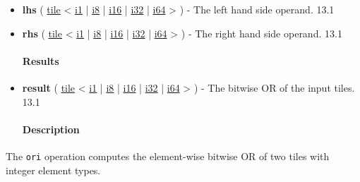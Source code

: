 \documentclass{article}
\begin{document}
\begin{itemize}
\item \textbf{lhs} ( \href{https://docs.nvidia.com/cuda/tile-ir/latest/sections/types.html#type-tile}{tile} < \href{https://docs.nvidia.com/cuda/tile-ir/latest/sections/types.html#subsection-element-types}{i1} | \href{https://docs.nvidia.com/cuda/tile-ir/latest/sections/types.html#subsection-element-types}{i8} | \href{https://docs.nvidia.com/cuda/tile-ir/latest/sections/types.html#subsection-element-types}{i16} | \href{https://docs.nvidia.com/cuda/tile-ir/latest/sections/types.html#subsection-element-types}{i32} | \href{https://docs.nvidia.com/cuda/tile-ir/latest/sections/types.html#subsection-element-types}{i64} > ) - The left hand side operand. 13.1
\item \textbf{rhs} ( \href{https://docs.nvidia.com/cuda/tile-ir/latest/sections/types.html#type-tile}{tile} < \href{https://docs.nvidia.com/cuda/tile-ir/latest/sections/types.html#subsection-element-types}{i1} | \href{https://docs.nvidia.com/cuda/tile-ir/latest/sections/types.html#subsection-element-types}{i8} | \href{https://docs.nvidia.com/cuda/tile-ir/latest/sections/types.html#subsection-element-types}{i16} | \href{https://docs.nvidia.com/cuda/tile-ir/latest/sections/types.html#subsection-element-types}{i32} | \href{https://docs.nvidia.com/cuda/tile-ir/latest/sections/types.html#subsection-element-types}{i64} > ) - The right hand side operand. 13.1


\paragraph{Results}

\item \textbf{result} ( \href{https://docs.nvidia.com/cuda/tile-ir/latest/sections/types.html#type-tile}{tile} < \href{https://docs.nvidia.com/cuda/tile-ir/latest/sections/types.html#subsection-element-types}{i1} | \href{https://docs.nvidia.com/cuda/tile-ir/latest/sections/types.html#subsection-element-types}{i8} | \href{https://docs.nvidia.com/cuda/tile-ir/latest/sections/types.html#subsection-element-types}{i16} | \href{https://docs.nvidia.com/cuda/tile-ir/latest/sections/types.html#subsection-element-types}{i32} | \href{https://docs.nvidia.com/cuda/tile-ir/latest/sections/types.html#subsection-element-types}{i64} > ) - The bitwise OR of the input tiles. 13.1


\paragraph{Description}

\end{itemize}
The \texttt{ori} operation computes the element-wise bitwise OR of two tiles with integer element types.
\end{document}
